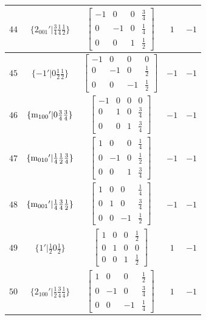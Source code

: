 \documentclass[fleqn,8pt]{jsarticle}
\begin{document}
\begin{longtable}{ccccc}
$ 44 $ & $ \{2{}_{001}{}'|\frac{3}{4} \frac{1}{4} \frac{1}{2}\} $ & $ \begin{bmatrix} -1 & 0 & 0 & \frac{3}{4} \\ 0 & -1 & 0 & \frac{1}{4} \\ 0 & 0 & 1 & \frac{1}{2} \end{bmatrix} $ & $ 1 $ & $ -1 $ \\ \hline
$ 45 $ & $ \{-1{}'|0 \frac{1}{2} \frac{1}{2}\} $ & $ \begin{bmatrix} -1 & 0 & 0 & 0 \\ 0 & -1 & 0 & \frac{1}{2} \\ 0 & 0 & -1 & \frac{1}{2} \end{bmatrix} $ & $ -1 $ & $ -1 $ \\ \hline
$ 46 $ & $ \{{\rm m}_{100}{}'|0 \frac{3}{4} \frac{3}{4}\} $ & $ \begin{bmatrix} -1 & 0 & 0 & 0 \\ 0 & 1 & 0 & \frac{3}{4} \\ 0 & 0 & 1 & \frac{3}{4} \end{bmatrix} $ & $ -1 $ & $ -1 $ \\ \hline
$ 47 $ & $ \{{\rm m}_{010}{}'|\frac{1}{4} \frac{1}{2} \frac{3}{4}\} $ & $ \begin{bmatrix} 1 & 0 & 0 & \frac{1}{4} \\ 0 & -1 & 0 & \frac{1}{2} \\ 0 & 0 & 1 & \frac{3}{4} \end{bmatrix} $ & $ -1 $ & $ -1 $ \\ \hline
$ 48 $ & $ \{{\rm m}_{001}{}'|\frac{1}{4} \frac{3}{4} \frac{1}{2}\} $ & $ \begin{bmatrix} 1 & 0 & 0 & \frac{1}{4} \\ 0 & 1 & 0 & \frac{3}{4} \\ 0 & 0 & -1 & \frac{1}{2} \end{bmatrix} $ & $ -1 $ & $ -1 $ \\ \hline
$ 49 $ & $ \{1{}'|\frac{1}{2} 0 \frac{1}{2}\} $ & $ \begin{bmatrix} 1 & 0 & 0 & \frac{1}{2} \\ 0 & 1 & 0 & 0 \\ 0 & 0 & 1 & \frac{1}{2} \end{bmatrix} $ & $ 1 $ & $ -1 $ \\ \hline
$ 50 $ & $ \{2{}_{100}{}'|\frac{1}{2} \frac{3}{4} \frac{1}{4}\} $ & $ \begin{bmatrix} 1 & 0 & 0 & \frac{1}{2} \\ 0 & -1 & 0 & \frac{3}{4} \\ 0 & 0 & -1 & \frac{1}{4} \end{bmatrix} $ & $ 1 $ & $ -1 $ \\ \hline

\end{longtable}
\end{document}
